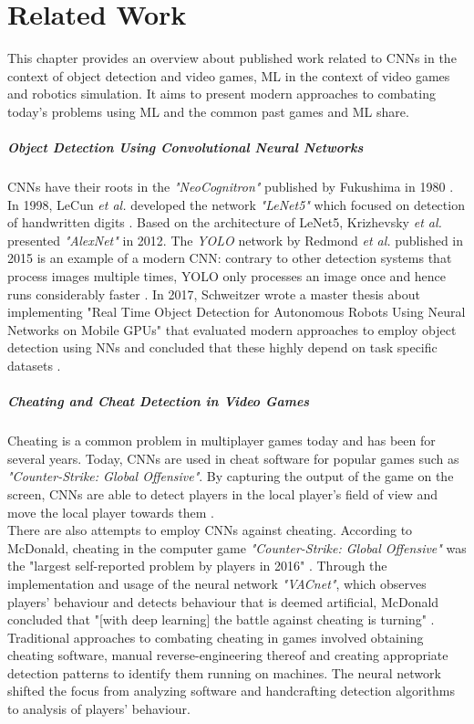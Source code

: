\chapter{Related Work}
\label{chap:related-work}

This chapter provides an overview about published work related to \acp{CNN} in the context of object detection and video games, \ac{ML} in the context of video games and robotics simulation. It aims to present modern approaches to combating today's problems using \ac{ML} and the common past games and \ac{ML} share.

\paragraph{Object Detection Using Convolutional Neural Networks}
\acp{CNN} have their roots in the \emph{"NeoCognitron"} published by Fukushima in 1980 \cite{6313076}. In 1998, LeCun \textit{et al.} developed the network \textit{"LeNet5"} which focused on detection of handwritten digits \cite{Lecun98gradient-basedlearning}. Based on the architecture of LeNet5, Krizhevsky \textit{et al.} presented \emph{"AlexNet"} in 2012. The \emph{\ac{YOLO}} network by Redmond \textit{et al.} published in 2015 is an example of a modern \ac{CNN}: contrary to other detection systems that process images multiple times, \ac{YOLO} only processes an image once and hence runs considerably faster \cite{redmon2016yolo9000}\cite{yolov3}\cite{DBLP:journals/corr/RedmonDGF15}.
In 2017, Schweitzer wrote a master thesis about implementing "Real Time Object Detection for Autonomous Robots Using Neural Networks on Mobile GPUs" that evaluated modern approaches to employ object detection using \acp{NN} and concluded that these highly depend on task specific datasets \cite{Schweitzer2017}.

\paragraph{Cheating and Cheat Detection in Video Games}
Cheating is a common problem in multiplayer games today and has been for several years. Today, \acp{CNN} are used in cheat software for popular games such as \textit{"Counter-Strike: Global Offensive"}. By capturing the output of the game on the screen, \acp{CNN} are able to detect players in the local player's field of view and move the local player towards them \cite{Hayha}.\\
There are also attempts to employ \acp{CNN} against cheating. According to McDonald, cheating in the computer game \textit{"Counter-Strike: Global Offensive"} was the "largest self-reported problem by players in 2016" \cite{VACnet}. Through the implementation and usage of the neural network \emph{"VACnet"}, which observes players' behaviour and detects behaviour that is deemed artificial, McDonald concluded that "[with deep learning] the battle against cheating is turning" \cite{VACnet}. Traditional approaches to combating cheating in games involved obtaining cheating software, manual reverse-engineering thereof and creating appropriate detection patterns to identify them running on machines. The neural network shifted the focus from analyzing software and handcrafting detection algorithms to analysis of players' behaviour.

